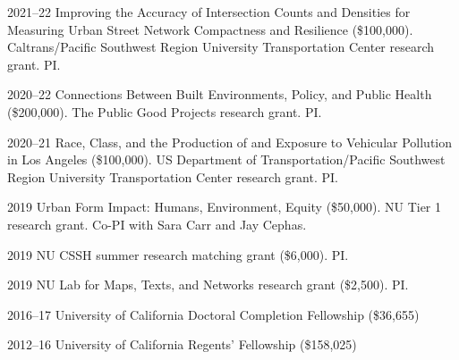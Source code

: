 \documentclass[11pt,letterpaper]{report}
\begin{document}
    \begin{tablist}

        \item[2021--22] \tab{}Improving the Accuracy of Intersection Counts and Densities for Measuring Urban Street Network Compactness and Resilience (\$100,000). Caltrans/Pacific Southwest Region University Transportation Center research grant. PI.\@

        \item[2020--22] \tab{}Connections Between Built Environments, Policy, and Public Health (\$200,000). The Public Good Projects research grant. PI.\@

        \item[2020--21] \tab{}Race, Class, and the Production of and Exposure to Vehicular Pollution in Los Angeles (\$100,000). US Department of Transportation/Pacific Southwest Region University Transportation Center research grant. PI.\@

        \item[2019] \tab{}Urban Form Impact: Humans, Environment, Equity (\$50,000). NU Tier 1 research grant. Co-PI with Sara Carr and Jay Cephas.

        \item[2019] \tab{}NU CSSH summer research matching grant (\$6,000). PI.\@

        \item[2019] \tab{}NU Lab for Maps, Texts, and Networks research grant (\$2,500). PI.\@




        \item[2016--17] \tab{}University of California Doctoral Completion Fellowship (\$36,655)




        \item[2012--16] \tab{}University of California Regents' Fellowship (\$158,025)

    \end{tablist}
\end{document}
